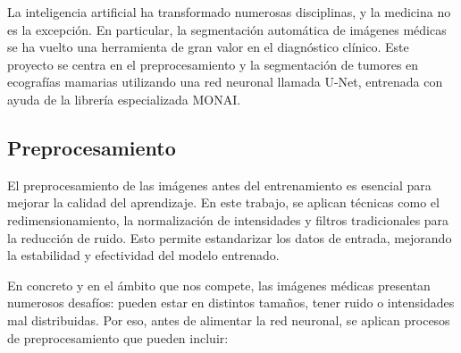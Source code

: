 \documentclass[12pt]{article}
\begin{document}
La inteligencia artificial ha transformado numerosas disciplinas, y la medicina no es la excepción. \cite{litjens2017survey} En particular, la segmentación automática de imágenes médicas se ha vuelto una herramienta de gran valor en el diagnóstico clínico. Este proyecto se centra en el preprocesamiento y la segmentación de tumores en ecografías mamarias utilizando una red neuronal llamada U-Net, entrenada con ayuda de la librería especializada MONAI.

\subsection{Preprocesamiento}

El preprocesamiento de las imágenes antes del entrenamiento es esencial para mejorar la calidad del aprendizaje. En este trabajo, se aplican técnicas como el redimensionamiento, la normalización de intensidades y filtros tradicionales para la reducción de ruido. Esto permite estandarizar los datos de entrada, mejorando la estabilidad y efectividad del modelo entrenado.

En concreto y en el ámbito que nos compete, las imágenes médicas presentan numerosos desafíos: pueden estar en distintos tamaños, tener ruido o intensidades mal distribuidas. Por eso, antes de alimentar la red neuronal, se aplican procesos de preprocesamiento que pueden incluir:
\end{document}
